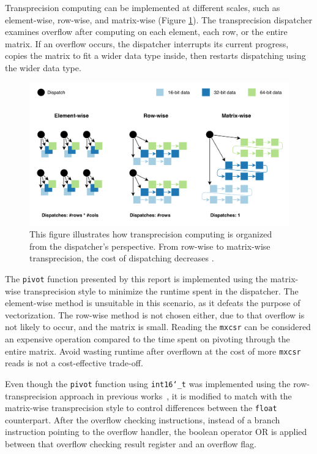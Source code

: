 \documentclass[logo,bsc,singlespacing,parskip]{infthesis}
\newcommand{\dtshort}{\texttt{int16\char`_t}}
\newcommand{\dtfloat}{\texttt{float}}
\newcommand{\mxcsr}{\texttt{mxcsr}}
\newcommand{\pivot}{\texttt{pivot}}
\begin{document}
Transprecision computing can be implemented at different scales, such as element-wise, row-wise, and matrix-wise (Figure \ref{fig:transprecision-dispatch}). The transprecision dispatcher examines overflow after computing on each element, each row, or the entire matrix. If an overflow occurs, the dispatcher interrupts its current progress, copies the matrix to fit a wider data type inside, then restarts dispatching using the wider data type. 

\begin{figure}[H]
\begin{center}
    \includegraphics[width=\linewidth]{image/transprecision-dispatch.png}
    \caption{This figure illustrates how transprecision computing is organized from the dispatcher's perspective. From row-wise to matrix-wise transprecision, the cost of dispatching decreases \cite{FPL1}.}
    \label{fig:transprecision-dispatch}
\end{center}
\end{figure}

The \pivot{} function presented by this report is implemented using the matrix-wise transprecision style to minimize the runtime spent in the dispatcher. The element-wise method is unsuitable in this scenario, as it defeats the purpose of vectorization. The row-wise method is not chosen either, due to that overflow is not likely to occur, and the matrix is small. Reading the \mxcsr{} can be considered an expensive operation compared to the time spent on pivoting through the entire matrix. Avoid wasting runtime after overflown at the cost of more \mxcsr{} reads is not a cost-effective trade-off.

Even though the \pivot{} function using \dtshort{} was implemented using the row-transprecision approach in previous works~\cite{FPL2}, it is modified to match with the matrix-wise transprecision style to control differences between the \dtfloat{} counterpart. After the overflow checking instructions, instead of a branch instruction pointing to the overflow handler, the boolean operator OR is applied between that overflow checking result register and an overflow flag. 
\end{document}
